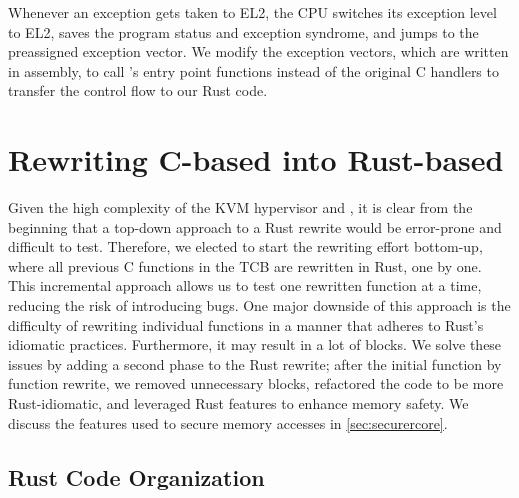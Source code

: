 Whenever an exception gets taken to EL2, the CPU switches its exception level
to EL2, saves the program status and exception syndrome, and jumps to the
preassigned exception vector.
We modify the exception vectors, which are written in assembly, to call
\rustcore{}'s entry point functions instead of the original C handlers to
transfer the control flow to our Rust code.

\section{Rewriting C-based \secore{} into Rust-based \rustcore{}}

%

Given the high complexity of the KVM hypervisor and \secore{},
it is clear from the beginning that
a top-down approach to a Rust rewrite would be error-prone and difficult to test.
Therefore, we elected to start the rewriting effort bottom-up,
where all previous C functions in the TCB are rewritten in Rust, one by one.
This incremental approach allows us to test one rewritten function at a time,
reducing the risk of introducing bugs.
One major downside of this approach is the difficulty of rewriting individual
functions in a manner that adheres to Rust's idiomatic practices.
Furthermore, it may result in a lot of  blocks.
We solve these issues by adding a second phase to the Rust rewrite;
after the initial function by function rewrite, we removed unnecessary
 blocks, refactored the code to be more Rust-idiomatic,
and leveraged Rust features to enhance \rustcore{} memory safety.
We discuss the features used to secure \rustcore{} memory accesses in
\autoref{sec:securercore}.

\subsection{Rust Code Organization}

